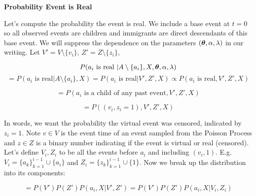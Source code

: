 \documentclass[11pt]{article}
\begin{document}


\vspace{1cm}
\noindent\textbf{Probability Event is Real}

\noindent Let's compute the probability the event is real. We include a base event at $t = 0$ so all observed events are children and immigrants are direct descendants of this base event. We will suppress the dependence on the parameters $(\boldsymbol{\theta},\alpha,\lambda)$ in our writing. Let $V' = V \setminus \{v_i\}$, $Z' = Z \setminus \{z_i\}$,

\[
  P(a_i \text{ is real } | A \setminus \{a_i\}, X, \boldsymbol{\theta}, \alpha, \lambda)
\]
\[
  =
  P(a_i \text{ is real} | A \setminus \{a_i\}, X)
  =
  P(a_i \text{ is real} | V', Z', X)
  \propto
  P(a_i \text{ is real}, V', Z', X)
\]

\[
  =
  P(a_i \text{ is a child of any past event}, V', Z', X)   
\]

\[
  =
  P((v_i,z_i=1) , V', Z', X)   
\]

\noindent In words, we want the probability the virtual event was censored, indicated by $z_i = 1$. Note $v \in V$ is the event time of an event sampled from the Poisson Process and $z \in Z$ is a binary number indicating if the event is virtual or real (censored). Let's define $V_i,Z_i$ to be all the events before $a_i$ and including $(v_i,1)$. E.g. $V_i = \{a_k\}_ {k=1}^{i-1} \cup \{a_i\}$ and $Z_i = \{z_k\}_{k=1}^{i-1} \cup \{1\}$. Now we break up the distribution into its components:

\[
  =
  P(V')P(Z')P(a_i, X | V', Z')
  =
  P(V')P(Z')P(a_i, X | V_i, Z_i)
\]
\end{document}
